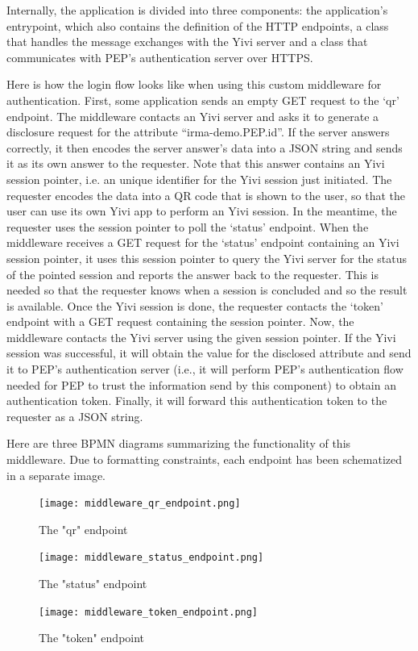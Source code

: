 \documentclass{report}
\begin{document}
Internally, the application is divided into three components: the application's entrypoint, which also contains the definition of the HTTP endpoints, a class that handles the
message exchanges with the Yivi server and a class that communicates with PEP's authentication server over HTTPS. \par
Here is how the login flow looks like when using this custom middleware for authentication. First, some application sends an empty GET request to the \enquote*{qr} endpoint. The
middleware contacts an Yivi server and asks it to generate a disclosure request for the attribute \enquote{irma-demo.PEP.id}. If the server answers
correctly, it then encodes the server answer's data into a JSON string and sends it as its own answer to the requester. Note that this answer contains an Yivi session pointer, i.e.
an unique identifier for the Yivi session just initiated. The requester encodes the data into a QR code that is shown to the user, so that the user can use its own Yivi app to
perform an Yivi session. In the meantime, the requester uses the session pointer to poll the \enquote*{status} endpoint. When the middleware receives a GET request for the
\enquote*{status} endpoint containing an Yivi session pointer, it uses this session pointer to query the Yivi server for the status of the pointed session and reports the answer
back to the requester. This is needed so that the requester knows when a session is concluded and so the result is available. Once the Yivi session is done, the requester contacts
the \enquote*{token} endpoint with a GET request containing the session pointer. Now, the middleware contacts the Yivi server using the given session pointer. If the Yivi session
was successful, it will obtain the value for the disclosed attribute and send it to PEP's authentication server (i.e., it will perform PEP's authentication flow needed for PEP to trust the information send by this component) to obtain an authentication token. Finally, it will forward this authentication token to the requester as a JSON string. \par
Here are three BPMN diagrams summarizing the functionality of this middleware. Due to formatting constraints, each endpoint has been schematized in a separate image.

\begin{figure}[H]
		\texttt{[image: middleware\_qr\_endpoint.png]}
		\vspace{-10pt}
		\caption{The "qr" endpoint}
		\vspace{10pt}

		\texttt{[image: middleware\_status\_endpoint.png]}
		\vspace{-10pt}
		\caption{The "status" endpoint}
		\vspace{10pt}

		\texttt{[image: middleware\_token\_endpoint.png]}
		\vspace{-10pt}
		\caption{The "token" endpoint}
\end{figure}
\end{document}
